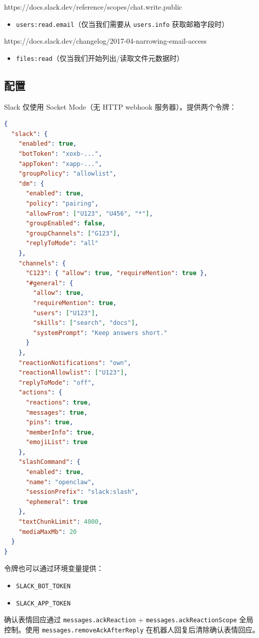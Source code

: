 https://docs.slack.dev/reference/scopes/chat.write.public
\begin{itemize}
  \item \texttt{users:read.email}（仅当我们需要从 \texttt{users.info} 获取邮箱字段时）
\end{itemize}

https://docs.slack.dev/changelog/2017-04-narrowing-email-access
\begin{itemize}
  \item \texttt{files:read}（仅当我们开始列出/读取文件元数据时）
\end{itemize}


\subsection{配置}


Slack 仅使用 Socket Mode（无 HTTP webhook 服务器）。提供两个令牌：

\begin{lstlisting}[language=json]
{
  "slack": {
    "enabled": true,
    "botToken": "xoxb-...",
    "appToken": "xapp-...",
    "groupPolicy": "allowlist",
    "dm": {
      "enabled": true,
      "policy": "pairing",
      "allowFrom": ["U123", "U456", "*"],
      "groupEnabled": false,
      "groupChannels": ["G123"],
      "replyToMode": "all"
    },
    "channels": {
      "C123": { "allow": true, "requireMention": true },
      "#general": {
        "allow": true,
        "requireMention": true,
        "users": ["U123"],
        "skills": ["search", "docs"],
        "systemPrompt": "Keep answers short."
      }
    },
    "reactionNotifications": "own",
    "reactionAllowlist": ["U123"],
    "replyToMode": "off",
    "actions": {
      "reactions": true,
      "messages": true,
      "pins": true,
      "memberInfo": true,
      "emojiList": true
    },
    "slashCommand": {
      "enabled": true,
      "name": "openclaw",
      "sessionPrefix": "slack:slash",
      "ephemeral": true
    },
    "textChunkLimit": 4000,
    "mediaMaxMb": 20
  }
}
\end{lstlisting}


令牌也可以通过环境变量提供：

\begin{itemize}
  \item \texttt{SLACK\_BOT\_TOKEN}
  \item \texttt{SLACK\_APP\_TOKEN}
\end{itemize}


确认表情回应通过 \texttt{messages.ackReaction} + \texttt{messages.ackReactionScope} 全局控制。使用 \texttt{messages.removeAckAfterReply} 在机器人回复后清除确认表情回应。

